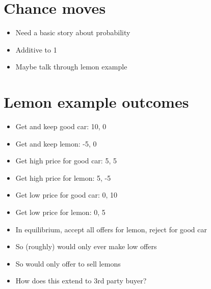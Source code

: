 \documentclass[11pt,]{article}
\providecommand{\tightlist}{%
  \setlength{\itemsep}{0pt}\setlength{\parskip}{0pt}}
\begin{document}
\hypertarget{chance-moves}{%
\section{Chance moves}\label{chance-moves}}

\begin{itemize}
\tightlist
\item
  Need a basic story about probability
\item
  Additive to 1
\item
  Maybe talk through lemon example
\end{itemize}

\hypertarget{lemon-example-outcomes}{%
\section{Lemon example outcomes}\label{lemon-example-outcomes}}

\begin{itemize}
\tightlist
\item
  Get and keep good car: 10, 0
\item
  Get and keep lemon: -5, 0
\item
  Get high price for good car: 5, 5
\item
  Get high price for lemon: 5, -5
\item
  Get low price for good car: 0, 10
\item
  Get low price for lemon: 0, 5
\item
  In equilibrium, accept all offers for lemon, reject for good car
\item
  So (roughly) would only ever make low offers
\item
  So would only offer to sell lemons
\item
  How does this extend to 3rd party buyer?
\end{itemize}
\end{document}
